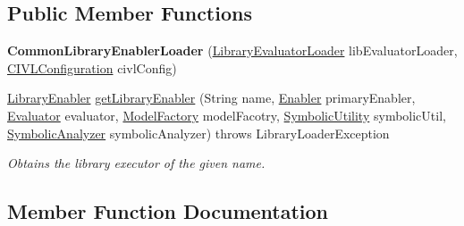 \subsection*{Public Member Functions}
\begin{DoxyCompactItemize}
\item 
\hypertarget{classedu_1_1udel_1_1cis_1_1vsl_1_1civl_1_1kripke_1_1common_1_1CommonLibraryEnablerLoader_ad6dfb713a813e0d2269cf328d435ce5d}{}{\bfseries Common\+Library\+Enabler\+Loader} (\hyperlink{interfaceedu_1_1udel_1_1cis_1_1vsl_1_1civl_1_1semantics_1_1IF_1_1LibraryEvaluatorLoader}{Library\+Evaluator\+Loader} lib\+Evaluator\+Loader, \hyperlink{classedu_1_1udel_1_1cis_1_1vsl_1_1civl_1_1config_1_1IF_1_1CIVLConfiguration}{C\+I\+V\+L\+Configuration} civl\+Config)\label{classedu_1_1udel_1_1cis_1_1vsl_1_1civl_1_1kripke_1_1common_1_1CommonLibraryEnablerLoader_ad6dfb713a813e0d2269cf328d435ce5d}

\item 
\hyperlink{interfaceedu_1_1udel_1_1cis_1_1vsl_1_1civl_1_1kripke_1_1IF_1_1LibraryEnabler}{Library\+Enabler} \hyperlink{classedu_1_1udel_1_1cis_1_1vsl_1_1civl_1_1kripke_1_1common_1_1CommonLibraryEnablerLoader_af495f1de8896b287b64145cda5dc6eb3}{get\+Library\+Enabler} (String name, \hyperlink{interfaceedu_1_1udel_1_1cis_1_1vsl_1_1civl_1_1kripke_1_1IF_1_1Enabler}{Enabler} primary\+Enabler, \hyperlink{interfaceedu_1_1udel_1_1cis_1_1vsl_1_1civl_1_1semantics_1_1IF_1_1Evaluator}{Evaluator} evaluator, \hyperlink{interfaceedu_1_1udel_1_1cis_1_1vsl_1_1civl_1_1model_1_1IF_1_1ModelFactory}{Model\+Factory} model\+Facotry, \hyperlink{interfaceedu_1_1udel_1_1cis_1_1vsl_1_1civl_1_1dynamic_1_1IF_1_1SymbolicUtility}{Symbolic\+Utility} symbolic\+Util, \hyperlink{interfaceedu_1_1udel_1_1cis_1_1vsl_1_1civl_1_1semantics_1_1IF_1_1SymbolicAnalyzer}{Symbolic\+Analyzer} symbolic\+Analyzer)  throws Library\+Loader\+Exception 
\begin{DoxyCompactList}\small\item\em Obtains the library executor of the given name. \end{DoxyCompactList}\end{DoxyCompactItemize}


\subsection{Member Function Documentation}
\hypertarget{classedu_1_1udel_1_1cis_1_1vsl_1_1civl_1_1kripke_1_1common_1_1CommonLibraryEnablerLoader_af495f1de8896b287b64145cda5dc6eb3}{}
